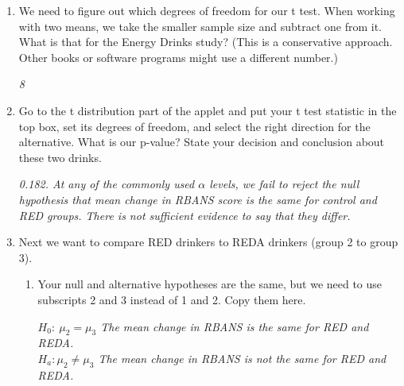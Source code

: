 \begin{enumerate}
\item We need to figure out which degrees of freedom for our t
  test. When working with two means, we take the smaller sample size
  and subtract one from it. What is that for the Energy Drinks study?
  ({\small This is a conservative approach. Other books or software
    programs might use a different number.})
\begin{students}
    \vspace{2.6cm}    
\end{students}

\begin{key}
  {\it  8}
\end{key}

 \item  Go to the t distribution part of the applet and put your t
   test statistic in the top box, 
   set its degrees of freedom, and select the right direction for the
   alternative.  What is our p-value?  State your decision and 
   conclusion about these two drinks. 
\begin{students}
    \vspace{5cm}    
\end{students}

\begin{key}
  {\it 0.182. At any of the commonly used $\alpha$ levels, we fail to
    reject the null hypothesis that mean change in RBANS score is the
    same for control and RED groups.  There is not sufficient evidence
    to say that they differ.}
\end{key}


 \item  Next we want to compare RED drinkers to REDA drinkers (group 2
   to group 3). 

   \begin{enumerate}
     \item Your null and alternative hypotheses are the same, but we
       need to use subscripts 2 and 3 instead of 1 and 2.  Copy them
       here. 
\begin{students}
    \vspace{2cm}    
\end{students}

\begin{key}
  {\it   $H_0:\ \mu_2 = \mu_3$ The mean change in RBANS is the same
    for RED and REDA.    \\ $H_a: \mu_2 \neq \mu_3$ The
    mean change in RBANS is not the same for RED and REDA.  }
\end{key}
 


\end{enumerate}
\end{enumerate}
